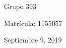 \documentclass[12pt, letterpaper]{article}
\begin{document}
\begin{titlepage}
{	%
	
	
	\vfill
	{\large Grupo 393}

	{\large Matrícula: 1155057}
	\vfill
	\vfill %
	
	{\large Septiembre 9, 2019} %
	
	
	 
	
	\vfill %
}	
\end{titlepage}

\end{document}
